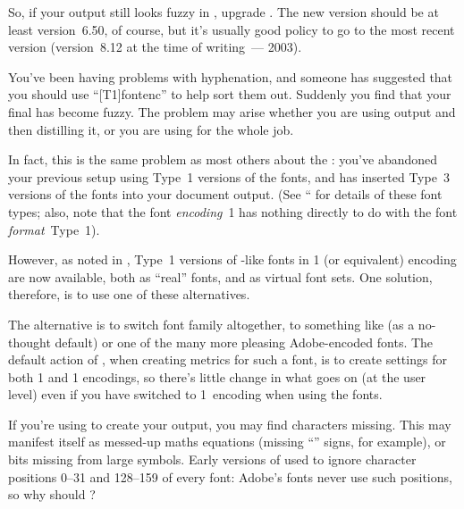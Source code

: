So, if your   output still looks fuzzy in 
, upgrade .  The new version
should be at least version~6.50, of course, but it's usually good
policy to go to the most recent version (version~8.12 at the time of
writing~--- 2003).


You've been having problems with hyphenation, and someone has
suggested that you should use ``[T1]{fontenc}''
to help sort them out.  Suddenly you find that your final 
has become fuzzy.  The problem may arise whether you are using \PS{}
output and then distilling it, or you are using \PDFTeX{} for the
whole job.

In fact, this is the same problem as most others about the
: you've abandoned
your previous setup using Type~1 versions of the  fonts, and
 has inserted Type~3 versions of the  fonts
into your document output.  (See %
``
for details of these font types; also, note that the font
\emph{encoding}~1
has nothing directly to do with the font \emph{format}~Type~1).

However, as noted in %
,
Type~1 versions of -like fonts in 1 (or equivalent) encoding
are now available, both as ``real'' fonts, and as virtual font sets.
One solution, therefore, is to use one of these alternatives.

The alternative is to switch font family altogether, to something like
 (as a no-thought default) or one of the many more pleasing
Adobe-encoded fonts.  The default action of , when
creating metrics for such a font, is to create settings for both 1
and 1 encodings, so there's little change in what goes on (at the
user level) even if you have switched to 1~encoding when using the
fonts.


If you're using   to create your
 output, you may find
characters missing.  This may manifest
itself as messed-up maths equations (missing
``\latexhtml{\ensuremath{-}}{-}'' signs, for example), or bits missing
from large symbols.  Early versions of  used to
ignore character positions 0--31 and 128--159 of every font: Adobe's
fonts never use such positions, so why should ?

